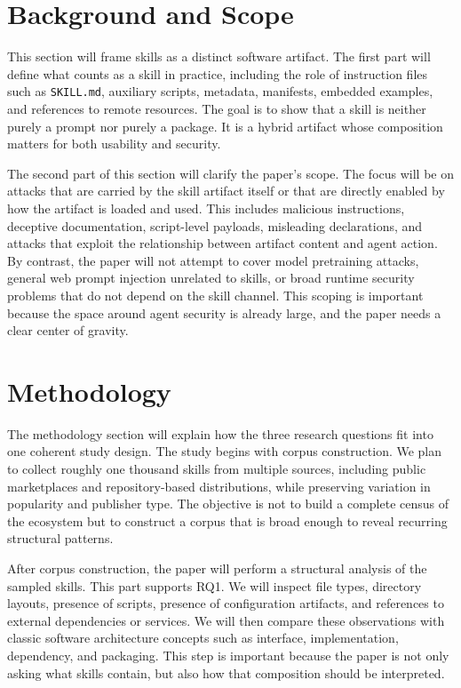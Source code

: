 \documentclass[conference]{IEEEtran}
\begin{document}
\section{Background and Scope}

This section will frame skills as a distinct software artifact. The
first part will define what counts as a skill in practice, including the
role of instruction files such as \texttt{SKILL.md}, auxiliary scripts,
metadata, manifests, embedded examples, and references to remote
resources. The goal is to show that a skill is neither purely a prompt
nor purely a package. It is a hybrid artifact whose composition matters
for both usability and security.

The second part of this section will clarify the paper's scope. The
focus will be on attacks that are carried by the skill artifact itself
or that are directly enabled by how the artifact is loaded and used.
This includes malicious instructions, deceptive documentation,
script-level payloads, misleading declarations, and attacks that exploit
the relationship between artifact content and agent action. By contrast,
the paper will not attempt to cover model pretraining attacks, general
web prompt injection unrelated to skills, or broad runtime security
problems that do not depend on the skill channel. This scoping is
important because the space around agent security is already large, and
the paper needs a clear center of gravity.

\section{Methodology}

The methodology section will explain how the three research questions
fit into one coherent study design. The study begins with corpus
construction. We plan to collect roughly one thousand skills from
multiple sources, including public marketplaces and repository-based
distributions, while preserving variation in popularity and publisher
type. The objective is not to build a complete census of the ecosystem
but to construct a corpus that is broad enough to reveal recurring
structural patterns.

After corpus construction, the paper will perform a structural analysis
of the sampled skills. This part supports RQ1. We will inspect file
types, directory layouts, presence of scripts, presence of configuration
artifacts, and references to external dependencies or services. We will
then compare these observations with classic software architecture
concepts such as interface, implementation, dependency, and packaging.
This step is important because the paper is not only asking what skills
contain, but also how that composition should be interpreted.
\end{document}
